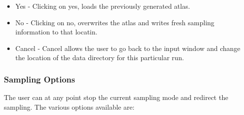 \documentclass[10pt]{article}
\begin{document}
\begin{itemize}
\item Yes - Clicking on yes, loads the previously generated atlas.
\item No - Clicking on no, overwrites the atlas and writes fresh sampling information to that locatin.
\item Cancel - Cancel allows the user to go back to the input window and change the location of the data
directory for this particular run.
\end{itemize}



\subsubsection{Sampling Options}
The user can at any point stop the current sampling mode and redirect the sampling. The various options
available are:
\end{document}
